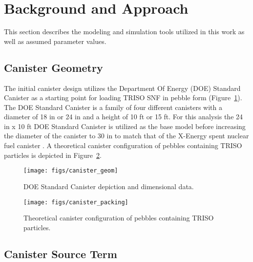 \documentclass{anstrans}
\begin{document}
\section{Background and Approach}

This section describes the modeling and simulation tools utilized in this work as well as assumed parameter values.

\subsection{Canister Geometry}

The initial canister design utilizes the Department Of Energy (DOE) Standard Canister \cite{doe_canister} as a starting point for loading TRISO SNF in pebble form (Figure~\ref{fig:canister_geom}).
The DOE Standard Canister is a family of four different canisters with a diameter of 18 in or 24 in and a height of 10 ft or 15 ft.
For this analysis the 24 in x 10 ft DOE Standard Canister is utilized as the base model before increasing the diameter of the canister to 30 in to match that of the X-Energy spent nuclear fuel canister \cite{xenergy}.
A theoretical canister configuration of pebbles containing TRISO particles is depicted in Figure~\ref{fig:canister_packing}.
\begin{figure}[ht] %
  \centering
  \texttt{[image: figs/canister\_geom]}
  \caption{DOE Standard Canister depiction and dimensional data.}
  \label{fig:canister_geom}
\end{figure}
\begin{figure}[ht] %
  \centering
  \texttt{[image: figs/canister\_packing]}
  \caption{Theoretical canister configuration of pebbles containing TRISO particles.}
  \label{fig:canister_packing}
\end{figure}

\subsection{Canister Source Term}
\end{document}
